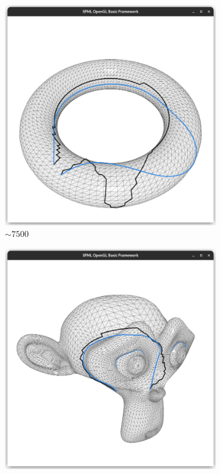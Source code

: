 \documentclass{stdlocal}
\begin{document}
\begin{figure}
  \centering
  \begin{subfigure}[b]{0.24\linewidth}
    \centering
    \includegraphics[width=\linewidth,trim={25px 20 25 50},clip]{images/torus-geodesic-1.png}
    \caption{$\sim 7500$}
  \end{subfigure}
  \begin{subfigure}[b]{0.24\linewidth}
    \centering
    \includegraphics[width=\linewidth,trim={25px 20 25 50},clip]{images/suzanne-geodesic-1.png}

\end{subfigure}
\end{figure}
\end{document}
